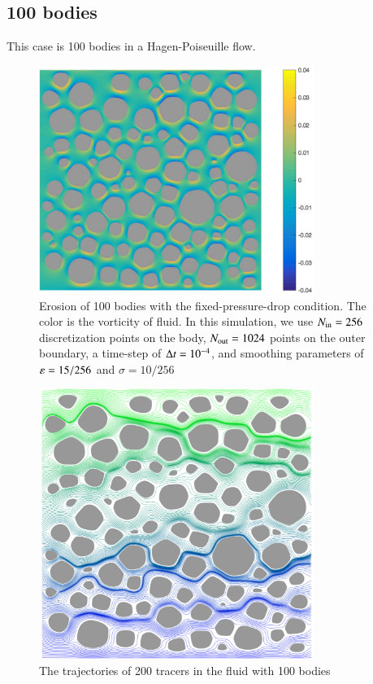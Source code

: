 \documentclass[preprint, 10pt]{elsarticle}
\begin{document}
\subsection{100 bodies}
{\color{red}
This case is 100 bodies in a Hagen-Poiseuille flow.
}
\begin{figure}[H]
\begin{center}
\includegraphics[width = 0.8\textwidth]{./figs/100b_50}
\caption{\label{fig:Eroding100vort} Erosion of 100 bodies with the fixed-pressure-drop condition. The color is the vorticity of fluid. In this simulation, we use $N_{\mathrm{in}} = 256$ discretization points on the body, $N_{\mathrm{out}} = 1024$ points on the outer boundary, a time-step of $\Delta t=10^{-4}$, and smoothing parameters of $\varepsilon= 15/256$ and $\sigma=10/256 $}
\end{center}
\end{figure}
\begin{figure}[H]
\begin{center}
\includegraphics[width = 0.8\textwidth]{./figs/100b_t100tracer}
\caption{\label{fig:Eroding100tracer} The trajectories of 200 tracers in the fluid with 100 bodies}
\end{center}
\end{figure}
\end{document}
